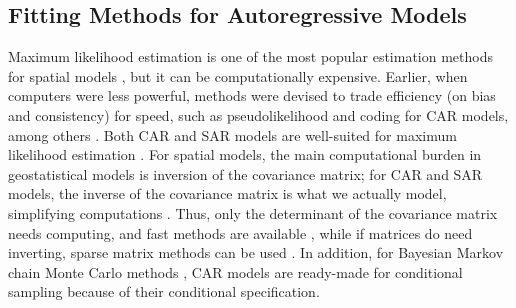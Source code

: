 \documentclass[11pt, titlepage]{article}\usepackage[]{graphicx}\usepackage[]{color}
\begin{document}
\begin{spacing}{1.9}
\begin{flushleft}
\subsection*{Fitting Methods for Autoregressive Models}

Maximum likelihood estimation is one of the most popular estimation methods for spatial models \citep{Cres:stat:1993}, but it can be computationally expensive. Earlier, when computers were less powerful, methods were devised to trade efficiency (on bias and consistency) for speed, such as pseudolikelihood \citep{Besa:stat:1975} and coding \citep{Besa:spat:1974} for CAR models, among others \citep{Cres:stat:1993}.  Both CAR and SAR models are well-suited for maximum likelihood estimation \citep{Bane:Carl:Gelf:hier:2014}. For spatial models, the main computational burden in geostatistical models is inversion of the covariance matrix; for CAR and SAR models, the inverse of the covariance matrix is what we actually model, simplifying computations \citep{Paci:spat:2013}.  Thus, only the determinant of the covariance matrix needs computing, and fast methods are available \citep{ Pace:Barr:fast:1997, Pace:Barr:spar:1997}, while if matrices do need inverting, sparse matrix methods can be used \citep{Rue:Held:Gaus:2005}. In addition, for Bayesian Markov chain Monte Carlo methods \citep[MCMC;][]{Gelf:Smit:samp:1990}, CAR models are ready-made for conditional sampling because of their conditional specification.


\end{flushleft}
\end{spacing}
\end{document}
